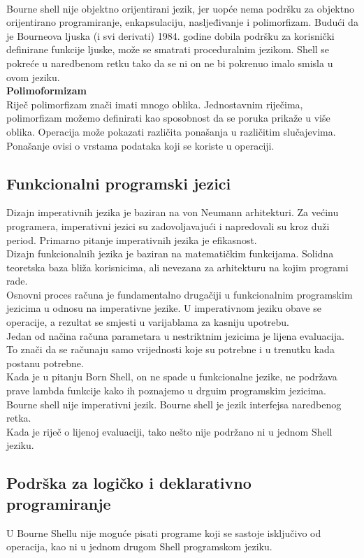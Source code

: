 \documentclass[11pt]{book}
\begin{document}
\\

Bourne shell nije objektno orijentirani jezik, jer uopće nema podršku za objektno orijentirano programiranje, enkapsulaciju, nasljeđivanje i polimorfizam. Budući da je Bourneova ljuska (i svi derivati) 1984. godine dobila podršku za korisnički definirane funkcije ljuske, može se smatrati proceduralnim jezikom. Shell se pokreće u naredbenom retku tako da se ni on ne bi pokrenuo imalo smisla u ovom jeziku.\\

\textbf{Polimoformizam}\\
Riječ polimorfizam znači imati mnogo oblika. Jednostavnim riječima, polimorfizam možemo definirati kao sposobnost da se poruka prikaže u više oblika. Operacija može pokazati različita ponašanja u različitim slučajevima. Ponašanje ovisi o vrstama podataka koji se koriste u operaciji.

\subsection{Funkcionalni programski jezici}
Dizajn imperativnih jezika je baziran na von Neumann arhitekturi. Za većinu programera, imperativni jezici su zadovoljavajući i napredovali su kroz duži period. Primarno pitanje imperativnih jezika je efikasnost.\\
Dizajn funkcionalnih jezika je baziran na matematičkim funkcijama. Solidna teoretska baza bliža korisnicima, ali nevezana za arhitekturu na kojim programi rade.\\
Osnovni proces računa je fundamentalno drugačiji u funkcionalnim programskim jezicima u odnosu na imperativne jezike. U imperativnom jeziku obave se operacije, a rezultat se smjesti u varijablama za kasniju upotrebu.\\
Jedan od načina računa parametara u nestriktnim jezicima je lijena evaluacija. To znači da se računaju samo vrijednosti koje su potrebne i u trenutku kada postanu potrebne.\\
Kada je u pitanju Born Shell, on ne spade u funkcionalne jezike, ne podržava prave lambda funkcije kako ih poznajemo u drguim programskim jezicima. Bourne shell nije imperativni jezik.
Bourne shell je jezik interfejsa naredbenog retka.\\
Kada je riječ o lijenoj evaluaciji, tako nešto nije podržano ni u jednom Shell jeziku.

\subsection{Podrška za logičko i deklarativno programiranje}
U Bourne Shellu nije moguće pisati programe koji se sastoje isključivo od operacija, kao ni u jednom drugom Shell programskom jeziku.
\end{document}

